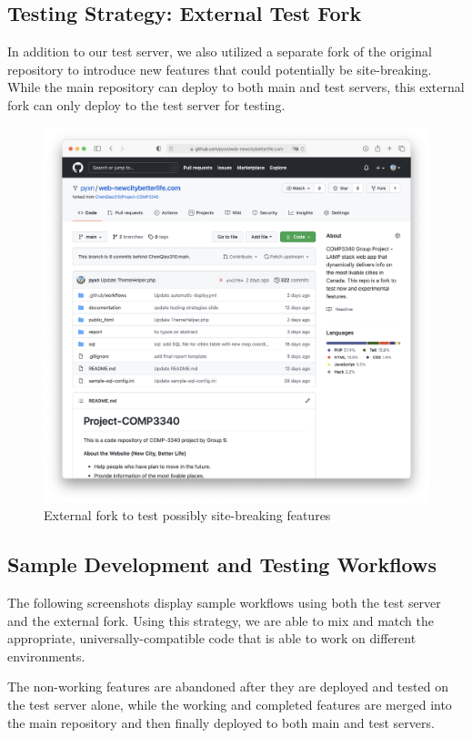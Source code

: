 \documentclass[12pt, letterpaper]{article}
\begin{document}
\subsection*{Testing Strategy: External Test Fork}
In addition to our test server, we also utilized a separate fork of the original repository to introduce new features that could potentially be site-breaking. While the main repository can deploy to both main and test servers, this external fork can only deploy to the test server for testing.

\begin{figure}[htbp]
	\centering
	\includegraphics[width=\textwidth]{images/28-external-fork.png}
	\caption{External fork to test possibly site-breaking features}
 \end{figure}

 \subsection*{Sample Development and Testing Workflows}
 The following screenshots display sample workflows using both the test server and the external fork. Using this strategy, we are able to mix and match the appropriate, universally-compatible code that is able to work on different environments. 
 
 The non-working features are abandoned after they are deployed and tested on the test server alone, while the working and completed features are merged into the main repository and then finally deployed to both main and test servers.
\end{document}
